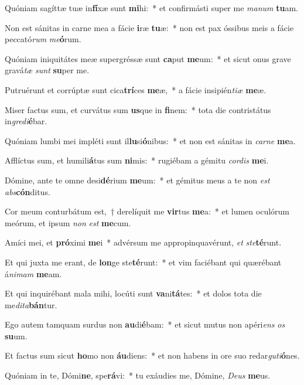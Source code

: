 \item Quóniam sagíttæ tuæ in\textbf{fí}xæ sunt \textbf{mi}hi:~* et confirmásti super me \textit{ma}\textit{num} \textbf{tu}am.
\item Non est sánitas in carne mea a fácie \textbf{i}ræ \textbf{tu}æ:~* non est pax óssibus meis a fácie peccató\textit{rum} \textit{me}\textbf{ó}rum.
\item Quóniam iniquitátes meæ supergréssæ sunt \textbf{ca}put \textbf{me}um:~* et sicut onus grave gravá\textit{tæ} \textit{sunt} \textbf{su}per me.
\item Putruérunt et corrúptæ sunt cica\textbf{trí}ces \textbf{me}æ,~* a fácie insipién\textit{ti}\textit{æ} \textbf{me}æ.
\item Miser factus sum, et curvátus sum \textbf{us}que in \textbf{fi}nem:~* tota die contristátus in\textit{gre}\textit{di}\textbf{é}bar.
\item Quóniam lumbi mei impléti sunt il\textbf{lu}si\textbf{ó}nibus:~* et non est sánitas in \textit{car}\textit{ne} \textbf{me}a.
\item Afflíctus sum, et humili\textbf{á}tus sum \textbf{ni}mis:~* rugiébam a gémitu \textit{cor}\textit{dis} \textbf{me}i.
\item Dómine, ante te omne desi\textbf{dé}rium \textbf{me}um:~* et gémitus meus a te non \textit{est} \textit{abs}\textbf{cón}ditus.
\item Cor meum conturbátum est,~† derelíquit me \textbf{vir}tus \textbf{me}a:~* et lumen oculórum meórum, et ipsum \textit{non} \textit{est} \textbf{me}cum.
\item Amíci mei, et \textbf{pró}ximi \textbf{me}i~* advérsum me appropinquavérunt, \textit{et} \textit{ste}\textbf{té}runt.
\item Et qui juxta me erant, de \textbf{lon}ge ste\textbf{té}runt:~* et vim faciébant qui quærébant á\textit{ni}\textit{mam} \textbf{me}am.
\item Et qui inquirébant mala mihi, locúti sunt \textbf{va}ni\textbf{tá}tes:~* et dolos tota die me\textit{di}\textit{ta}\textbf{bán}tur.
\item Ego autem tamquam surdus non \textbf{au}di\textbf{é}bam:~* et sicut mutus non apéri\textit{ens} \textit{os} \textbf{su}um.
\item Et factus sum sicut \textbf{ho}mo non \textbf{áu}diens:~* et non habens in ore suo redar\textit{gu}\textit{ti}\textbf{ó}nes.
\item Quóniam in te, Dómi\textbf{ne}, spe\textbf{rá}vi:~* tu exáudies me, Dómine, \textit{De}\textit{us} \textbf{me}us.
